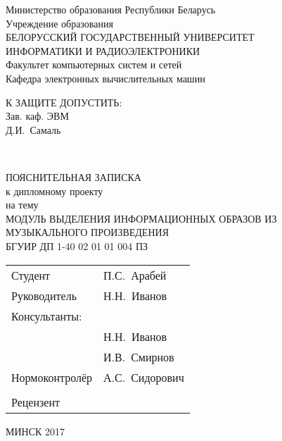 \begin{titlepage}
  \begin{center}
    Министерство образования Республики Беларусь\\[1em]
    Учреждение образования\\
    БЕЛОРУССКИЙ ГОСУДАРСТВЕННЫЙ УНИВЕРСИТЕТ \\
    ИНФОРМАТИКИ И РАДИОЭЛЕКТРОНИКИ\\[1em]

    Факультет компьютерных систем и сетей \\[0.6cm]

    Кафедра электронных вычислительных машин \\[1.4cm]

    \begin{flushright}
      \begin{minipage}{0.4\textwidth}
        \MakeUppercase{К защите допустить:}\\
        Зав. каф. ЭВМ\\
        \underline{\hspace*{2.8cm}} Д.И.~Самаль
      \end{minipage}\\[3.2em]
    \end{flushright}

    {ПОЯСНИТЕЛЬНАЯ ЗАПИСКА}\\
    {к дипломному проекту}\\
    {на тему}\\
    {\MakeUppercase{Модуль выделения информационных образов из музыкального произведения}}\\[2em]


    {БГУИР ДП 1-40 02 01 01 004 ПЗ}\\[2em]

    \begin{tabular}{ p{}p{} }
      Студент & П.С.~Арабей  \\[1em]

      Руководитель & Н.Н.~Иванов \\[1em]

      Консультанты: &\\[1em]

      \hspace*{6ex}{от кафедры ЭВМ} & Н.Н.~Иванов \\[1em]

      \hspace*{6ex}{по экономической части} & И.В.~Смирнов \\[1em]

      Нормоконтролёр & А.С.~Сидорович\\
      & \\
      Рецензент &
    \end{tabular}

    \vfill
    {\normalsize МИНСК 2017}
  \end{center}
\end{titlepage}
